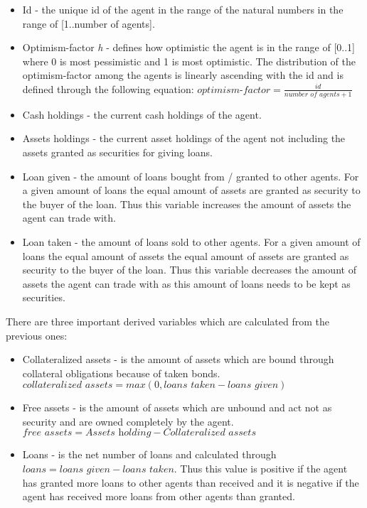 \documentclass[Bachelorarbeit.tex]{subfiles}
\begin{document}
\begin{itemize}
\item Id - the unique id of the agent in the range of the natural numbers in the range of [1..number of agents].
\item Optimism-factor \textit{h} - defines how optimistic the agent is in the range of [0..1] where 0 is most pessimistic and 1 is most optimistic. The distribution of the optimism-factor among the agents is linearly ascending with the id and is defined through the following equation: \linebreak $\textit{optimism-factor} = \frac{id}{\textit{number of agents} + 1}$
\item Cash holdings - the current cash holdings of the agent.
\item Assets holdings - the current asset holdings of the agent not including the assets granted as securities for giving loans.
\item Loan given - the amount of loans bought from / granted to other agents. For a given amount of loans the equal amount of assets are granted as security to the buyer of the loan. Thus this variable increases the amount of assets the agent can trade with.
\item Loan taken - the amount of loans sold to other agents. For a given amount of loans the equal amount of assets the equal amount of assets are granted as security to the buyer of the loan. Thus this variable decreases the amount of assets the agent can trade with as this amount of loans needs to be kept as securities.
\end{itemize}

\medskip

There are three important derived variables which are calculated from the previous ones:

\begin{itemize}
\item Collateralized assets - is the amount of assets which are bound through collateral obligations because of taken bonds. \linebreak $\textit{collateralized assets} = max( 0, \textit{loans taken} - \textit{loans given} )$
\item Free assets - is the amount of assets which are unbound and act not as security and are owned completely by the agent. \linebreak $\textit{free assets} = \textit{Assets holding} - \textit{Collateralized assets}$
\item Loans - is the net number of loans and calculated through $\textit{loans} = \textit{loans given} - \textit{loans taken}$. Thus this value is positive if the agent has granted more loans to other agents than received and it is negative if the agent has received more loans from other agents than granted.
\end{itemize}
\end{document}
